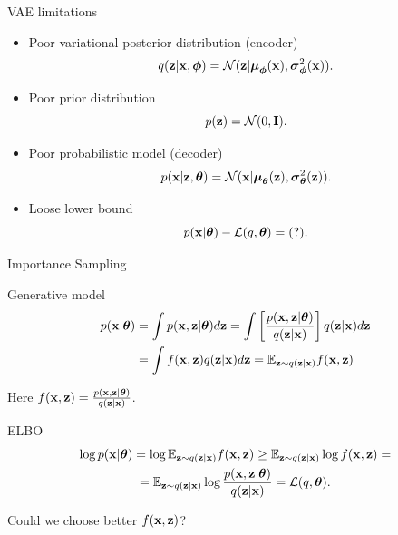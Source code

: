 \begin{frame}{VAE limitations}
	\begin{itemize}
		\item Poor variational posterior distribution (encoder)
		\[
		q(\mathbf{z} | \mathbf{x}, \boldsymbol{\phi}) = \mathcal{N}(\mathbf{z}| \boldsymbol{\mu}_{\boldsymbol{\phi}}(\mathbf{x}), \boldsymbol{\sigma}^2_{\boldsymbol{\phi}}(\mathbf{x})).
		\]
		\item Poor prior distribution
		\[
		p(\mathbf{z}) = \mathcal{N}(0, \mathbf{I}).
		\]
		\item Poor probabilistic model (decoder)
		\[
		p(\mathbf{x} | \mathbf{z}, \boldsymbol{\theta}) = \mathcal{N}(\mathbf{x}| \boldsymbol{\mu}_{\boldsymbol{\theta}}(\mathbf{z}), \boldsymbol{\sigma}^2_{\boldsymbol{\theta}}(\mathbf{z})).
		\]
		\item Loose lower bound
		\[
		p(\mathbf{x} | \boldsymbol{\theta}) - \mathcal{L}(q, \boldsymbol{\theta}) = (?).
		\]
	\end{itemize}
\end{frame}
\begin{frame}{Importance Sampling}
	\begin{block}{Generative model}
		\vspace{-0.5cm}
		\begin{align*}
			p(\mathbf{x} | \boldsymbol{\theta}) &= \int p(\mathbf{x}, \mathbf{z} | \boldsymbol{\theta}) d\mathbf{z} = \int \left[\frac{p(\mathbf{x}, \mathbf{z} | \boldsymbol{\theta})}{q(\mathbf{z} | \mathbf{x})} \right] q(\mathbf{z} | \mathbf{x}) d\mathbf{z} \\
			&= \int f(\mathbf{x}, \mathbf{z}) q(\mathbf{z} | \mathbf{x}) d\mathbf{z} = \mathbb{E}_{\mathbf{z} \sim q(\mathbf{z} | \mathbf{x})} f(\mathbf{x}, \mathbf{z})
		\end{align*}
	\end{block}
	Here $f(\mathbf{x}, \mathbf{z}) = \frac{p(\mathbf{x}, \mathbf{z} | \boldsymbol{\theta})}{q(\mathbf{z} | \mathbf{x})}$.
	\begin{block}{ELBO}
		\vspace{-0.5cm}
		\begin{multline*}
			\log p(\mathbf{x} | \boldsymbol{\theta}) = \log \mathbb{E}_{\mathbf{z} \sim q(\mathbf{z} | \mathbf{x})} f(\mathbf{x}, \mathbf{z})
			\geq \mathbb{E}_{\mathbf{z} \sim q(\mathbf{z} | \mathbf{x})} \log f(\mathbf{x}, \mathbf{z}) = \\
			= \mathbb{E}_{\mathbf{z} \sim q(\mathbf{z} | \mathbf{x})} \log \frac{p(\mathbf{x}, \mathbf{z} | \boldsymbol{\theta})}{q(\mathbf{z} | \mathbf{x})} = \mathcal{L}(q, \boldsymbol{\theta}).
		\end{multline*}
	\end{block}
	Could we choose better $f(\mathbf{x}, \mathbf{z})$? 
\end{frame}
